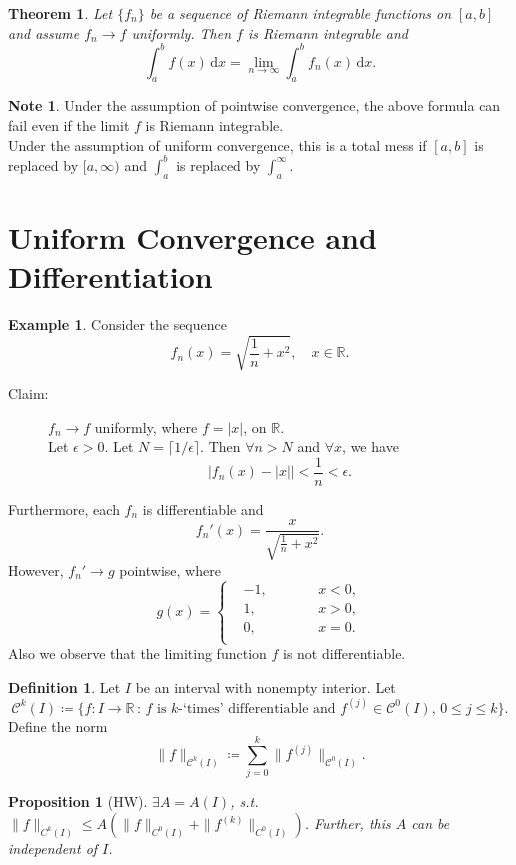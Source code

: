 \documentclass[12pt]{article}
\theoremstyle{plain}
\newtheorem{thm}{Theorem}
\newtheorem*{prop}{Proposition}
\theoremstyle{definition}
\newtheorem*{defn}{Definition}
\newtheorem*{eg}{Example}
\newtheorem*{note}{Note}
\begin{document}
\begin{thm}
    Let $\{f_n\}$ be a sequence of Riemann integrable functions on $[a,b]$ and
    assume $f_n\rightarrow f$ uniformly.
    Then $f$ is Riemann integrable and
    $$\int_a^b
    f(x)\,\mathrm{d}x=\lim_{n\rightarrow\infty}\int_a^bf_n(x)\,\mathrm{d}x.$$
\end{thm}

\begin{note}
    Under the assumption of pointwise convergence, the above formula can fail
    even if the limit $f$ is Riemann integrable.\\
    Under the assumption of uniform convergence, this is a total mess if $[a,b]$
    is replaced by $[a,\infty)$ and $\int_a^b$ is replaced by $\int_a^\infty$.\\
\end{note}


\section*{Uniform Convergence and Differentiation}
\begin{eg}
    Consider the sequence 
    $$f_n(x)=\sqrt{\frac{1}{n}+x^2},\quad x\in\mathbb{R}.$$
    \begin{description}
        \item[Claim:] $f_n\rightarrow f$ uniformly, where $f=|x|$, on
        $\mathbb{R}$.\\
        Let $\epsilon>0$. Let $N=\lceil1/\epsilon\rceil$. 
        Then $\forall n>N$ and $\forall x$,
        we have
        $$\left|f_n(x)-|x|\right|<\frac{1}{n}<\epsilon.$$
    \end{description}
    Furthermore,  each $f_n$ is differentiable and
    $$f_n'(x)=\frac{x}{\sqrt{\frac{1}{n}+x^2}}.$$
    However, $f_n'\rightarrow g$ pointwise, where
    $$g(x)=\left\{
        \begin{aligned}
            &-1,\qquad&&x<0,\\
            &1,\qquad&&x>0,\\
            &0,\qquad&&x=0.\\
        \end{aligned}
    \right.$$
    Also we observe that the limiting function $f$ is not differentiable.
\end{eg}
\begin{defn}
    Let $I$ be an interval with nonempty interior.
    Let 
    $$\mathcal{C}^k(I)\coloneqq\{f:I\rightarrow\mathbb{R}\,:\,f\text{ is
    }k\text{-`times' differentiable and }f^{(j)}\in \mathcal{C}^0(I),\,0\leq j\leq
    k\}.$$
    Define the norm
    $$\|f\|_{\mathcal{C}^k(I)}\coloneqq\sum_{j=0}^k\|f^{(j)}\|_{\mathcal{C}^0(I)}.$$
\end{defn}
\begin{prop}[HW]
    $\exists A=A(I)$, s.t. $\|f\|_{C^k(I)}\leq
    A(\|f\|_{C^0(I)}+\|f^{(k)}\|_{C^0(I)})$.
    Further, this $A$ can be independent of $I$.
\end{prop}
\end{document}
